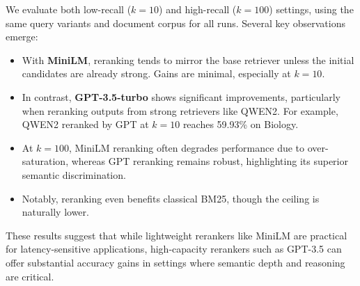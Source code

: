 \documentclass[11pt]{article}
\begin{document}
We evaluate both low-recall ($k=10$) and high-recall ($k=100$) settings, using the same query variants and document corpus for all runs.
Several key observations emerge:

\begin{itemize}
    \item With \textbf{MiniLM}, reranking tends to mirror the base retriever unless the initial candidates are already strong. Gains are minimal, especially at $k=10$.
    
    \item In contrast, \textbf{GPT-3.5-turbo} shows significant improvements, particularly when reranking outputs from strong retrievers like QWEN2. For example, QWEN2 reranked by GPT at $k=10$ reaches 59.93\% on Biology.
    
    \item At $k=100$, MiniLM reranking often degrades performance due to over-saturation, whereas GPT reranking remains robust, highlighting its superior semantic discrimination.
    
    \item Notably, reranking even benefits classical BM25, though the ceiling is naturally lower.
\end{itemize}

These results suggest that while lightweight rerankers like MiniLM are practical for latency-sensitive applications, high-capacity rerankers such as GPT-3.5 can offer substantial accuracy gains in settings where semantic depth and reasoning are critical.
\end{document}
